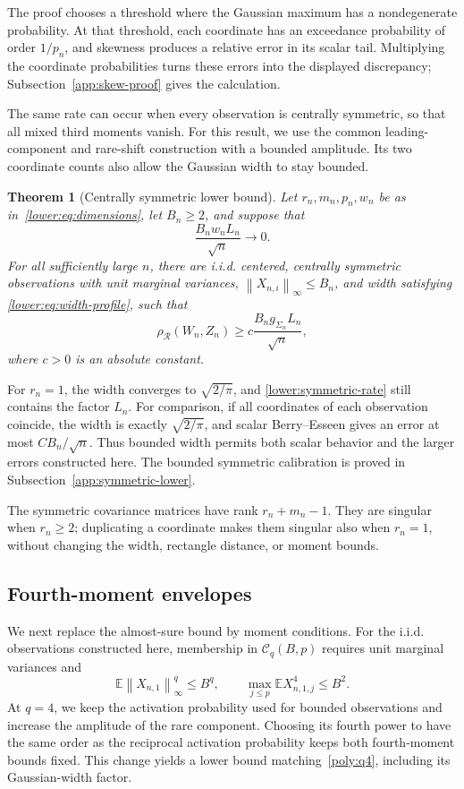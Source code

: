 \documentclass[11pt,letterpaper]{article}
\newtheorem{theorem}{Theorem}
\theoremstyle{remark}
\newcommand{\E}{\mathbb E}
\newcommand{\norm}[1]{\left\lVert#1\right\rVert}
\newcommand{\rh}{\rho_{\mathcal R}}
\begin{document}
The proof chooses a threshold where the Gaussian maximum has a
nondegenerate probability. At that threshold, each coordinate has
an exceedance probability of order $1/p_n$, and skewness produces
a relative error in its scalar tail. Multiplying the coordinate
probabilities turns these errors into the displayed discrepancy;
Subsection~\ref{app:skew-proof} gives the calculation.

The same rate can occur when every observation is centrally symmetric,
so that all mixed third moments vanish. For this result, we use the
common leading-component and rare-shift construction with a bounded
amplitude. Its two coordinate counts also allow the Gaussian width
to stay bounded.

\begin{theorem}[Centrally symmetric lower bound]\label{opt:symmetric-lower}
Let \(r_n,m_n,p_n,w_n\) be as in~\eqref{lower:eq:dimensions},
let \(B_n\ge2\), and suppose that
\[
 \frac{B_n w_nL_n}{\sqrt n}\longrightarrow0.
\]
For all sufficiently large \(n\), there are i.i.d. centered,
centrally symmetric observations with unit marginal variances,
\(\norm{X_{n,i}}_\infty\le B_n\), and width satisfying
\eqref{lower:eq:width-profile}, such that
\begin{equation}
 \rh(W_n,Z_n)\ge c\frac{B_n g_{\Sigma_n}L_n}{\sqrt n},
 \label{lower:symmetric-rate}
\end{equation}
where \(c>0\) is an absolute constant.
\end{theorem}

For $r_n=1$, the width converges to $\sqrt{2/\pi}$, and
\eqref{lower:symmetric-rate} still contains the factor $L_n$.
For comparison, if all coordinates of each observation coincide,
the width is exactly $\sqrt{2/\pi}$, and scalar Berry--Esseen
gives an error at most $CB_n/\sqrt n$. Thus bounded width
permits both scalar behavior and the larger errors constructed here.
The bounded symmetric calibration is proved in
Subsection~\ref{app:symmetric-lower}.

The symmetric covariance matrices have rank $r_n+m_n-1$.
They are singular when $r_n\ge2$; duplicating a coordinate
makes them singular also when $r_n=1$, without changing the
width, rectangle distance, or moment bounds.

\subsection{Fourth-moment envelopes}\label{opt:q4-comparison}

We next replace the almost-sure bound by moment conditions. For the
i.i.d. observations constructed here, membership in $\mathcal C_q(B,p)$
requires unit marginal variances and
\[
 \E\norm{X_{n,1}}_\infty^q\le B^q,\qquad
 \max_{j\le p}\E X_{n,1,j}^4\le B^2.
\]
At $q=4$, we keep the activation probability used for bounded
observations and increase the amplitude of the rare component.
Choosing its fourth power to have the same order as the reciprocal
activation probability keeps both fourth-moment bounds fixed.
This change yields a lower bound matching~\eqref{poly:q4}, including
its Gaussian-width factor.
\end{document}
